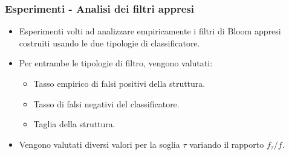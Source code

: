 \documentclass{beamer}
\begin{document}
\begin{frame}
    \frametitle{Esperimenti - Analisi dei filtri appresi}
    \begin{itemize}
        \item Esperimenti volti ad analizzare empiricamente i filtri di Bloom appresi costruiti usando le due tipologie di classificatore.
        \item Per entrambe le tipologie di filtro, vengono valutati:
        \begin{itemize}
            \item Tasso empirico di falsi positivi della struttura.
            \item Tasso di falsi negativi del classificatore.
            \item Taglia della struttura.
        \end{itemize} 
        \item Vengono valutati diversi valori per la soglia $\tau$ variando il rapporto $f_\tau/f$.
    \end{itemize}
\end{frame}
\end{document}
